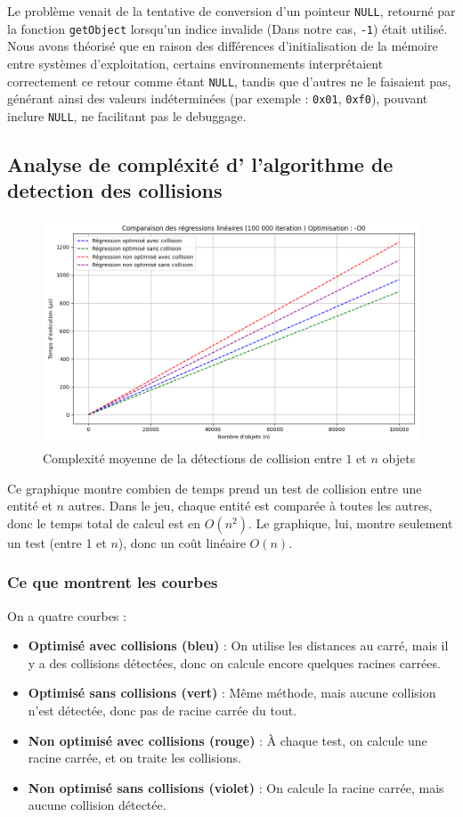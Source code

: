 \documentclass[a4paper,11pt]{article}
\begin{document}
Le problème venait de la tentative de conversion d'un pointeur \texttt{NULL}, retourné par la fonction \texttt{getObject} lorsqu'un indice invalide (Dans notre cas, \texttt{-1}) était utilisé.
Nous avons théorisé que en raison des différences d'initialisation de la mémoire entre systèmes d'exploitation, certains environnements interprétaient correctement ce retour comme étant \texttt{NULL}, tandis que d'autres ne le faisaient pas, générant ainsi des valeurs indéterminées (par exemple : \texttt{0x01}, \texttt{0xf0}), pouvant inclure \texttt{NULL}, ne facilitant pas le debuggage.


\subsection{Analyse de compléxité d' l'algorithme de detection des collisions}

\begin{figure}
    \centering
    \includegraphics[width=0.5\linewidth]{img/algoComparaison.png}
    \caption{Complexité moyenne de la détections de collision entre \(1\) et \(n\) objets}
    \label{fig:algoComparaison}
\end{figure}

Ce graphique montre combien de temps prend un test de collision entre une entité et $n$ autres. Dans le jeu, chaque entité est comparée à toutes les autres, donc le temps total de calcul est en $O(n^2)$. Le graphique, lui, montre seulement un test (entre 1 et $n$), donc un coût linéaire $O(n)$.

\subsubsection{Ce que montrent les courbes}

On a quatre courbes :
\begin{itemize}
    \item \textbf{Optimisé avec collisions (bleu)} : On utilise les distances au carré, mais il y a des collisions détectées, donc on calcule encore quelques racines carrées.
    \item \textbf{Optimisé sans collisions (vert)} : Même méthode, mais aucune collision n’est détectée, donc pas de racine carrée du tout.
    \item \textbf{Non optimisé avec collisions (rouge)} : À chaque test, on calcule une racine carrée, et on traite les collisions.
    \item \textbf{Non optimisé sans collisions (violet)} : On calcule la racine carrée, mais aucune collision détectée.
\end{itemize}
\end{document}
